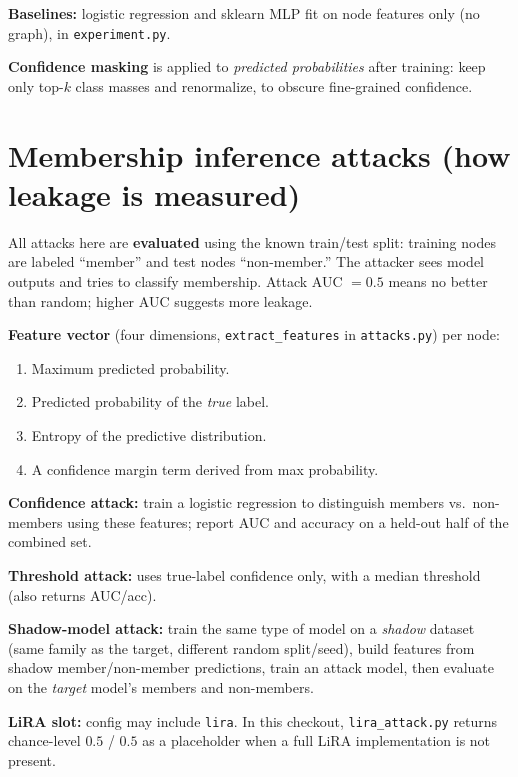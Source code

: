 \documentclass[11pt,a4paper]{article}
\begin{document}
\textbf{Baselines:} logistic regression and sklearn MLP fit on node features only (no graph), in \texttt{experiment.py}.

\textbf{Confidence masking} is applied to \emph{predicted probabilities} after training: keep only top-$k$ class masses and renormalize, to obscure fine-grained confidence.

\section{Membership inference attacks (how leakage is measured)}

All attacks here are \textbf{evaluated} using the known train/test split: training nodes are labeled ``member'' and test nodes ``non-member.'' The attacker sees model outputs and tries to classify membership. Attack AUC $= 0.5$ means no better than random; higher AUC suggests more leakage.

\textbf{Feature vector} (four dimensions, \texttt{extract\_features} in \texttt{attacks.py}) per node:
\begin{enumerate}
  \item Maximum predicted probability.
  \item Predicted probability of the \emph{true} label.
  \item Entropy of the predictive distribution.
  \item A confidence margin term derived from max probability.
\end{enumerate}

\textbf{Confidence attack:} train a logistic regression to distinguish members vs.\ non-members using these features; report AUC and accuracy on a held-out half of the combined set.

\textbf{Threshold attack:} uses true-label confidence only, with a median threshold (also returns AUC/acc).

\textbf{Shadow-model attack:} train the same type of model on a \emph{shadow} dataset (same family as the target, different random split/seed), build features from shadow member/non-member predictions, train an attack model, then evaluate on the \emph{target} model's members and non-members.

\textbf{LiRA slot:} config may include \texttt{lira}. In this checkout, \texttt{lira\_attack.py} returns chance-level $0.5$ / $0.5$ as a placeholder when a full LiRA implementation is not present.
\end{document}
